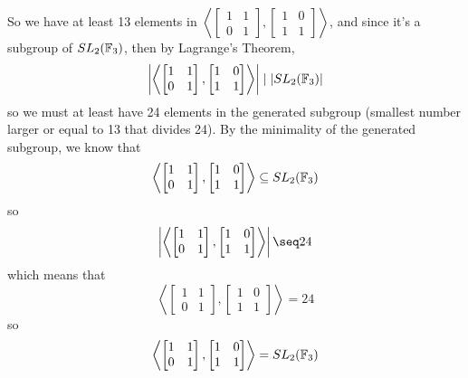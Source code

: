 \documentclass[12pt]{article}
\begin{document}
    So we have at least 13 elements in
    $\left\langle \begin{bmatrix} 1 & 1 \\ 0 & 1 \end{bmatrix},
    \begin{bmatrix} 1 & 0 \\ 1 & 1 \end{bmatrix} \right\rangle$,
    and since it's a subgroup of $SL_2(\mathbb{F}_3)$,
    then by Lagrange's Theorem,
    \[ \left|\left\langle \begin{bmatrix} 1 & 1 \\ 0 & 1 \end{bmatrix},
    \begin{bmatrix} 1 & 0 \\ 1 & 1 \end{bmatrix} \right\rangle \right| 
    \mid |SL_2(\mathbb{F}_3)| \]
    so we must at least have 24 elements in the generated subgroup
    (smallest number larger or equal to 13 that divides 24).
    By the minimality of the generated subgroup,
    we know that 
    \[ \left\langle \begin{bmatrix} 1 & 1 \\ 0 & 1 \end{bmatrix},
    \begin{bmatrix} 1 & 0 \\ 1 & 1 \end{bmatrix} \right\rangle
    \subseteq SL_2(\mathbb{F}_3) \]
    so
    \[\left| \left\langle \begin{bmatrix} 1 & 1 \\ 0 & 1 \end{bmatrix},
    \begin{bmatrix} 1 & 0 \\ 1 & 1 \end{bmatrix} \right\rangle \right|
    \seq 24\]
    which means that
    \[\left\langle \begin{bmatrix} 1 & 1 \\ 0 & 1 \end{bmatrix},
    \begin{bmatrix} 1 & 0 \\ 1 & 1 \end{bmatrix} \right\rangle = 24\]
    so
    \[\left\langle \begin{bmatrix} 1 & 1 \\ 0 & 1 \end{bmatrix},
    \begin{bmatrix} 1 & 0 \\ 1 & 1 \end{bmatrix} \right\rangle
    = SL_2(\mathbb{F}_3)\]
\end{document}
